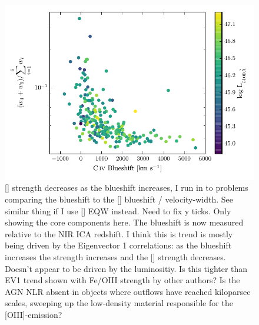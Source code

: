 \begin{figure}
    \centering
    \includegraphics[width=\textwidth]{figures/chapter04/civ_blueshift_oiii_strength.pdf} 
    \caption{[] strength decreases as the  blueshift increases, I run in to problems comparing the  blueshift to the [] blueshift / velocity-width. See similar thing if I use [] EQW instead. Need to fix y ticks. Only showing the core components here. The  blueshift is now measured relative to the NIR ICA redshift. I think this is trend is mostly being driven by the Eigenvector 1 correlations: as the blueshift increases the  strength increases and the [] strength decreases. Doesn't appear to be driven by the luminositiy. Is this tighter than EV1 trend shown with Fe/OIII strength by other authors? Is the AGN NLR absent in objects where outflows have reached
    kiloparsec scales, sweeping up the low-density material responsible for the [OIII]-emission?}     
    \label{fig:civ_blueshift_oiii_strength}
\end{figure}

